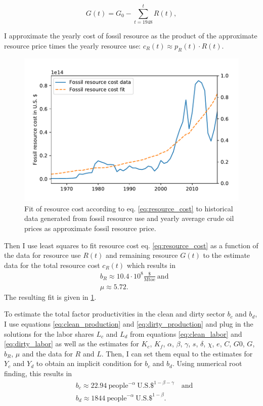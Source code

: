 \begin{equation} 
  G(t) = G_0 - \sum_{t=1948}^{t}R(t),
  \label{eq:fossil_resource_time_series}
\end{equation}

I approximate the yearly cost of fossil resource as the product of the approximate resource price times the yearly resource use: $c_R(t) \approx p_R(t) \cdot R(t)$. 
\begin{figure}
	\vspace{-.4 cm}
        \hspace{-1.25 cm}
        \includegraphics[width = .67 \textwidth]{./figures/resource_price_fit.pdf}
        \caption[Fit of model resource cost function to historical data]{Fit of resource cost according to eq. \ref{eq:resource_cost} to historical data generated from fossil resource use and yearly average crude oil prices as approximate fossil resource price. \label{fig:resource_cost_fit}}
\end{figure}
Then I use least squares to fit resource cost eq. \ref{eq:resource_cost} as a function of the data for resource use $R(t)$ and remaining resource $G(t)$ to the estimate data for the total resource cost $c_R(t)$ which results in 
\begin{align}
  &b_R \approx 10.4 \cdot 10^{8} \frac{\$}{\mathrm{Mtoe}} ~ \mathrm{and}\\
  & \mu \approx 5.72.
  \label{eq:estimate_resource_cost}
\end{align}
The resulting fit is given in \cref{fig:resource_cost_fit}.

To estimate the total factor productivities in the clean and dirty sector $b_c$ and $b_d$, I use equations \ref{eq:clean_production} and \ref{eq:dirty_production} and plug in the solutions for the labor shares $L_c$ and $L_d$ from equations \ref{eq:clean_labor} and \ref{eq:dirty_labor} as well as the estimates for $K_c$, $K_f$, $\alpha$, $\beta$, $\gamma$, $s$, $\delta$, $\chi$, $e$, $C$, $G0$, $G$, $b_R$, $\mu$ and the data for $R$ and $L$. Then, I can set them equal to the estimates for $Y_c$ and $Y_d$ to obtain an implicit condition for $b_c$ and $b_d$. Using numerical root finding, this results in 
 \begin{align}
  &b_c \approx 22.94 ~ \mathrm{people} ^{-\alpha} ~ \mathrm{U.S. \$}^{1-\beta-\gamma} \quad \mathrm{and} \\
  &b_d \approx 1844 ~ \mathrm{people}^{-\alpha} ~ \mathrm{U.S. \$}^{1-\beta}.
  \label{eq:estimate_total_factor_productivities}
\end{align}

